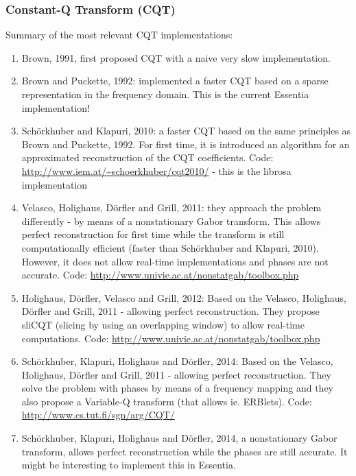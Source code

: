 \documentclass[letter,12pt,notitlepage]{article}
\begin{document}
\subsubsection{Constant-Q Transform (CQT)}


Summary of the most relevant CQT implementations:

\begin{enumerate}
	\item
	    Brown, 1991, first proposed CQT with a naive very slow implementation.
    \item
	    Brown and Puckette, 1992: implemented a faster CQT based on a sparse representation in the frequency domain. This is the current Essentia implementation!
    \item
	    Sch{\"o}rkhuber and Klapuri, 2010: a faster CQT based on the same principles as Brown and Puckette, 1992. For first time, it is introduced an algorithm for an approximated reconstruction of the CQT coefficients. Code: \url{http://www.iem.at/~schoerkhuber/cqt2010/} - this is the librosa implementation
    \item
	    Velasco, Holighaus, D{\"o}rfler and Grill, 2011: they approach the problem differently - by means of a nonstationary Gabor transform. This allows perfect reconstruction for first time while the transform is still computationally efficient (faster than Sch{\"o}rkhuber and Klapuri, 2010). However, it does not allow real-time implementations and phases are not accurate. Code: \url{http://www.univie.ac.at/nonstatgab/toolbox.php}
    \item
	    Holighaus, D{\"o}rfler, Velasco and Grill, 2012: Based on the Velasco, Holighaus, Dörfler and Grill, 2011 - allowing perfect reconstruction. They propose sliCQT (slicing by using an overlapping window) to allow real-time computations. Code: \url{http://www.univie.ac.at/nonstatgab/toolbox.php}
    \item
	    Sch{\"o}rkhuber, Klapuri, Holighaus and Dörfler, 2014: Based on the Velasco, Holighaus, Dörfler and Grill, 2011 - allowing perfect reconstruction. They solve the problem with phases by means of a frequency mapping and they also propose a Variable-Q transform (that allows ie. ERBlets). Code: \url{http://www.cs.tut.fi/sgn/arg/CQT/}
    \item
	    Sch{\"o}rkhuber, Klapuri, Holighaus and D{\"o}rfler, 2014, a nonstationary Gabor transform, allows perfect reconstruction while the phases are still accurate. It might be interesting to implement this in Essentia.
\end{enumerate}
\end{document}
